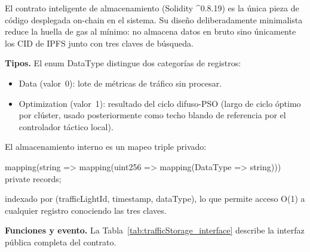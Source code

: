 El contrato inteligente de almacenamiento (Solidity \^{}0.8.19) es la única pieza de código desplegada on-chain en el sistema. Su diseño deliberadamente minimalista reduce la huella de gas al mínimo: no almacena datos en bruto sino únicamente los CID de IPFS junto con tres claves de búsqueda.

\textbf{Tipos.} El enum DataType distingue dos categorías de registros:

\begin{itemize}
    \item Data (valor~0): lote de métricas de tráfico sin procesar.
    \item Optimization (valor~1): resultado del ciclo difuso-PSO (largo de ciclo óptimo por clúster, usado posteriormente como techo blando de referencia por el controlador táctico local).
\end{itemize}

El almacenamiento interno es un mapeo triple privado:

\medskip
\centerline{mapping(string => mapping(uint256 => mapping(DataType => string))) private records;}
\medskip

\noindent indexado por (trafficLightId, timestamp, dataType), lo que permite acceso O(1) a cualquier registro conociendo las tres claves.

\textbf{Funciones y evento.} La Tabla~\ref{tab:trafficStorage_interface} describe la interfaz pública completa del contrato.

